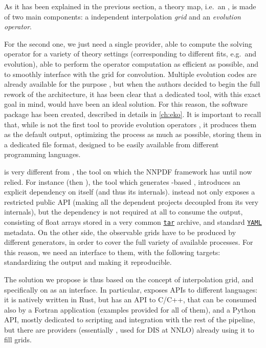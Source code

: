 
As it has been explained in the previous section, a theory map, i.e.\ an
\fktab, is made of two main components: a \pdf independent interpolation
\textit{grid} and an \textit{evolution operator}.

For the second one, we just need a single provider, able to compute the \dglap
solving operator for a variety of theory settings (corresponding to different
\pdf fits, e.g.\ \nlo and \nnlo \qcd evolution), able to perform the
operator computation as efficient as possible, and to smoothly interface with
the grid for convolution.
Multiple evolution codes are already available for the purpose
\cite{Vogt:2004ns,Salam:2008sz,Botje:2010ay,Bertone:2013vaa,Bertone:2017gds},
but when the authors decided to begin the full rework of the architecture, it
has been clear that a dedicated tool, with this exact goal in mind, would have
been an ideal solution.
For this reason, the software package \eko \cite{Candido:2022tld} has been
created, described in details in \cref{ch:eko}.
It is important to recall that, while \eko is not the first tool to provide
evolution operators \cite{Bertone:2013vaa,Salam:2008sz}, it produces them as
the default output, optimizing the process as much as possible, storing them in
a dedicated file format, designed to be easily available from different
programming languages.

\eko is very different from \apfel, the tool on which the NNPDF framework has
until now relied. For instance \apfelgrid (then \apfelcomb), the tool which
generates \apfel-based \fktab, introduces an explicit dependency on \apfel
itself (and thus its internals).
\eko instead not only exposes a restricted public API (making all the dependent
projects decoupled from its very internals), but the dependency is not required
at all to consume the \eko output, consisting of float arrays stored in a very
common \href{https://en.wikipedia.org/wiki/Tar\_(computing)}{\texttt{tar}}
archive, and standard \href{https://yaml.org/}{\texttt{YAML}} metadata.
On the other side, the observable grids have to be produced by different
generators, in order to cover the full variety of available processes.
For this reason, we need an interface to them, with the following targets:
standardizing the output and making it reproducible.

The solution we propose is thus based on the concept of interpolation grid, and
specifically on \pineappl as an interface.
In particular, \pineappl exposes APIs to different languages: it is natively
written in Rust, but has an API to C/C++, that can be consumed also by a
Fortran application (examples provided for all of them), and a Python API,
mostly dedicated to scripting and integration with the rest of the pipeline,
but there are providers (essentially \yadism
\cite{candido_alessandro_2022_6285149}, used for DIS at NNLO) already using it
to fill grids.

